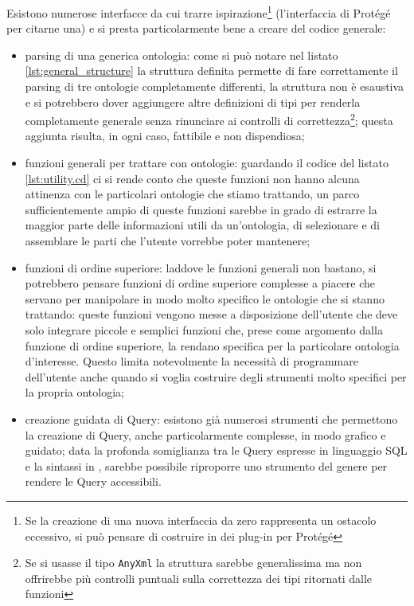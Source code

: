 Esistono numerose interfacce da cui trarre ispirazione\footnote{Se la creazione di una nuova interfaccia da zero rappresenta un ostacolo eccessivo, si può pensare di costruire in \cduce dei plug-in per Protégé} (l'interfaccia di Protégé per citarne una) e \cduce si presta particolarmente bene a creare del codice generale:
\begin{itemize}
	\item parsing di una generica ontologia: come si può notare nel listato \ref{lst:general_structure} la struttura definita permette di fare correttamente il parsing di tre ontologie completamente differenti, la struttura non è esaustiva e si potrebbero dover aggiungere altre definizioni di tipi per renderla completamente generale senza rinunciare ai controlli di correttezza\footnote{Se si usasse il tipo \texttt{AnyXml} la struttura sarebbe generalissima ma non offrirebbe più controlli puntuali sulla correttezza dei tipi ritornati dalle funzioni}; questa aggiunta risulta, in ogni caso, fattibile e non dispendiosa;
	\item funzioni generali per trattare con ontologie: guardando il codice del listato \ref{lst:utility.cd} ci si rende conto che queste funzioni non hanno alcuna attinenza con le particolari ontologie che stiamo trattando, un parco sufficientemente ampio di queste funzioni sarebbe in grado di estrarre la maggior parte delle informazioni utili da un'ontologia, di selezionare e di assemblare le parti che l'utente vorrebbe poter mantenere;
	\item\label{ch5.4_func}funzioni di ordine superiore: laddove le funzioni generali non bastano, si potrebbero pensare funzioni di ordine superiore complesse a piacere che servano per manipolare in modo molto specifico le ontologie che si stanno trattando: queste funzioni vengono messe a disposizione dell'utente che deve solo integrare piccole e semplici funzioni che, prese come argomento dalla funzione di ordine superiore, la rendano specifica per la particolare ontologia d'interesse. Questo limita notevolmente la necessità di programmare dell'utente anche quando si voglia costruire degli strumenti molto specifici per la propria ontologia;
	\item creazione guidata di Query: esistono già numerosi strumenti che permettono la creazione di Query, anche particolarmente complesse, in modo grafico e guidato; data la profonda somiglianza tra le Query espresse in linguaggio SQL e la sintassi in \cduce, sarebbe possibile riproporre uno strumento del genere per rendere le Query accessibili.	
\end{itemize}
